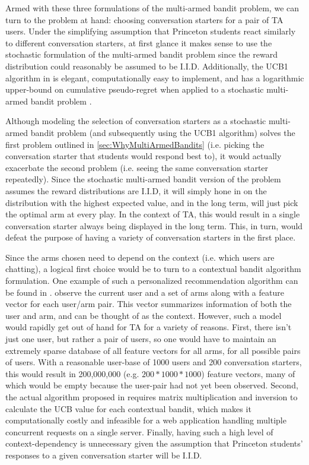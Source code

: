 Armed with these three formulations of the multi-armed bandit problem, we can turn to the problem at hand: choosing conversation starters for a pair of TA users. Under the simplifying assumption that Princeton students react similarly to different conversation starters, at first glance it makes sense to use the stochastic formulation of the multi-armed bandit problem since the reward distribution could reasonably be assumed to be I.I.D. Additionally, the UCB1 algorithm in is elegant, computationally easy to implement, and has a logarithmic upper-bound on cumulative pseudo-regret when applied to a stochastic multi-armed bandit problem \citep{auer02}.

Although modeling the selection of conversation starters as a stochastic multi-armed bandit problem (and subsequently using the UCB1 algorithm) solves the first problem outlined in \ref{sec:WhyMultiArmedBandits} (i.e. picking the conversation starter that students would respond best to), it would actually exacerbate the second problem (i.e. seeing the same conversation starter repeatedly). Since the stochastic multi-armed bandit version of the problem assumes the reward distributions are I.I.D, it will simply hone in on the distribution with the highest expected value, and in the long term, will just pick the optimal arm at every play. In the context of TA, this would result in a single conversation starter always being displayed in the long term. This, in turn, would defeat the purpose of having a variety of conversation starters in the first place.

Since the arms chosen need to depend on the context (i.e. which users are chatting), a logical first choice would be to turn to a contextual bandit algorithm formulation. One example of such a personalized recommendation algorithm can be found in \cite{chu10}. \cite{chu10} observe the current user and a set of arms along with a feature vector for each user/arm pair. This vector summarizes information of both the user and arm, and can be thought of as the context. However, such a model would rapidly get out of hand for TA for a variety of reasons. First, there isn't just one user, but rather a pair of users, so one would have to maintain an extremely sparse database of all feature vectors for all arms, for all possible pairs of users. With a reasonable user-base of 1000 users and 200 conversation starters, this would result in 200,000,000 (e.g. $200 * 1000 * 1000$) feature vectors, many of which would be empty because the user-pair had not yet been observed. Second, the actual algorithm proposed in \cite{chu10} requires matrix multiplication and inversion to calculate the UCB value for each contextual bandit, which makes it computationally costly and infeasible for a web application handling multiple concurrent requests on a single server. Finally, having such a high level of context-dependency is unnecessary given the assumption that Princeton students' responses to a given conversation starter will be I.I.D.

